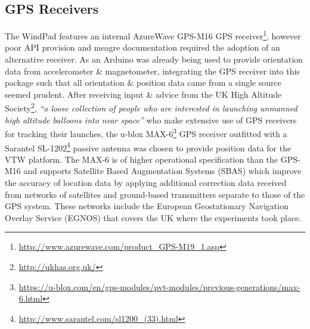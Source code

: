 
\subsection{GPS Receivers}

\newcommand{\azurewaveFootnote}{\footnote{\url{http://www.azurewave.com/product_GPS-M19_1.asp}}}

\newcommand{\habFootnote}{\footnote{\url{http://ukhas.org.uk/}}}

\newcommand{\ubloxFootnote}{\footnote{\url{https://u-blox.com/en/gps-modules/pvt-modules/previous-generations/max-6.html}}}

\newcommand{\sarantelFootnote}{\footnote{\url{http://www.sarantel.com/sl1200_(33).html}}}

\newcommand{\MAXvccFootnote}{\footnote{The MAX-6 requires 2.5 to 3.6V input on VCC, this table showing connection to 5V assumes a MAX-6 breakout with appropriate step down.}}

\newcommand{\MAXserialFootnote}{\footnote{The data pins of the MAX-6 need to be pulled up to between 0.7 to 1.0 of the supply to VCC, so a breakout with appropriate level shifters is required for connection directly to an Ardunio Uno R3's 5V digital pins.}}

\newcommand{\softwareserialFootnote}{\footnote{\url{http://arduino.cc/en/Reference/SoftwareSerial}}}

\newcommand{\maxProtocolFootnote}{\footnote{\url{https://u-blox.com/images/downloads/Product_Docs/u-blox6_ReceiverDescriptionProtocolSpec_(GPS.G6-SW-10018).pdf}}}

\newcommand{\tinygpsFootnote}{\footnote{\url{http://arduiniana.org/libraries/tinygps/}}}


The WindPad features an internal AzureWave GPS-M16 GPS receiver\azurewaveFootnote{}, however poor API provision and meagre documentation required the adoption of an alternative receiver. As an Arduino was already being used to provide orientation data from accelerometer \& magnetometer, integrating the GPS receiver into this package such that all orientation \& position data came from a single source seemed prudent. After receiving input \& advice from the UK High Altitude Society\habFootnote{}, \textit{``a loose collection of people who are interested in launching unmanned high altitude balloons into near space''} who make extensive use of GPS receivers for tracking their launches, the u-blox MAX-6\ubloxFootnote{} GPS receiver outfitted with a Sarantel SL-1202\sarantelFootnote{} passive antenna was chosen to provide position data for the VTW platform. The MAX-6 is of higher operational specification than the GPS-M16 and supports Satellite Based Augmentation Systems (SBAS) which improve the accuracy of location data by applying additional correction data received from networks of satellites and ground-based transmitters separate to those of the GPS system. These networks include the European Geostationary Navigation Overlay Service (EGNOS) that covers the UK where the experiments took place.

